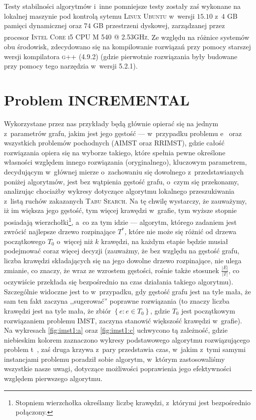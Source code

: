 Testy stabilności algorytmów i~inne pomniejsze testy zostały zaś wykonane na lokalnej maszynie pod kontrolą sytemu \textsc{Linux Ubuntu} w~wersji $15.10$ z~$4$ \textsc{GB} pamięci dynamicznej oraz $74$ \textsc{GB} przestrzeni dyskowej, zarządzanej przez procesor \textsc{Intel\textsuperscript{\textregistered} Core\textsuperscript{\texttrademark} i5 CPU M 540  @ 2.53GHz}. Ze względu na różnice systemów obu środowisk, zdecydowano się na kompilowanie rozwiązań przy pomocy starszej wersji kompilatora \textsc{g++} (\textsc{4.9.2}) (gdzie pierwotnie rozwiązania były budowane przy pomocy tego narzędzia w~wersji \textsc{5.2.1}).

\section{Problem INCREMENTAL}

Wykorzystane przez nas przykłady będą głównie opierać się na jednym z~parametrów grafu, jakim jest jego gęstość --- w~przypadku problemu  e~ oraz wszystkich problemów pochodnych (\textsc{AIMST} oraz \textsc{RRIMST}), gdzie całość rozwiązania opiera się na wyborze takiego, które spełnia pewne określone własności względem innego rozwiązania (oryginalnego), kluczowym parametrem, decydującym w~głównej mierze o~zachowaniu się dowolnego z~przedstawianych poniżej algorytmów, jest bez wątpienia gęstość grafu, o~czym się przekonamy, analizując chociażby wykresy dotyczące algorytmu lokalnego przeszukiwania z~listą ruchów zakazanych \textsc{Tabu Search}. Na tę chwilę wystarczy, że zauważymy, iż im większa jego gęstość, tym więcej krawędzi w~grafie, tym wyższe stopnie posiadają wierzchołki\footnote{Stopniem wierzchołka określamy liczbę krawędzi, z~którymi jest bezpośrednio połączony.}, a~co za tym idzie --- algorytm, którego zadaniem jest zwrócić najlepsze drzewo rozpinające $T^{\ast}$, które nie może się różnić od drzewa początkowego $T_{0}$ o~więcej niż $k$ krawędzi, na każdym etapie będzie musiał podejmować coraz więcej decyzji (zauważmy, że bez względu na gęstość grafu, liczba krawędzi składających się na jego dowolne drzewo rozpinające, nie ulega zmianie, co znaczy, że wraz ze wzrostem gęstości, rośnie także stosunek $\frac{\left| E \right|}{\left| T \right|}$, co oczywiście przekłada się bezpośrednio na czas działania takiego algorytmu). Szczególnie widoczne jest to w~przypadku, gdy gęstość grafu jest na tyle mała, że sam ten fakt zaczyna ,,sugerować'' poprawne rozwiązania (to znaczy liczba krawędzi jest na tyle mała, że zbiór $\left\{ e : e \in T_{0} \right\}$, gdzie $T_{0}$ jest początkowym rozwiązaniem problemu \textsc{IMST}, zaczyna stanowić większość krawędzi w~grafie). Na wykresach \ref{fig:imst1:a} oraz \ref{fig:imst1:c} uchwycono tą zależność, gdzie niebieskim kolorem zaznaczono wykresy podstawowego algorytmu rozwiązującego problem  t~, zaś druga krzywa z~pary przedstawia czas, w~jakim z~tymi samymi instancjami problemu poradził sobie algorytm, w~którym zastosowaliśmy wszystkie nasze uwagi, dotyczące możliwości poprawienia jego efektywności względem pierwszego algorytmu.

